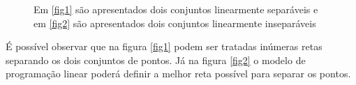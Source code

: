 \begin{figure}[!h]
\centering
{}
\qquad
{}
\label{img:linear_sepa}
\caption{Em \ref{fig1} são apresentados dois conjuntos linearmente separáveis e em \ref{fig2} são apresentados dois conjuntos linearmente inseparáveis}
\end{figure}

É possível observar que na figura \ref{fig1} podem ser tratadas inúmeras retas separando os dois conjuntos de pontos. Já na figura \ref{fig2} o modelo de programação linear poderá definir a melhor reta possível para separar os pontos.

